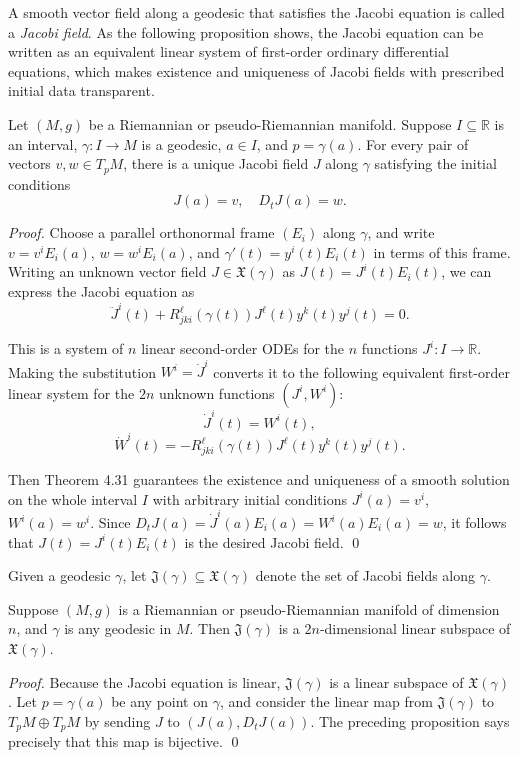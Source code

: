A smooth vector field along a geodesic that satisfies the Jacobi equation is called a \emph{Jacobi field}. As the following proposition shows, the Jacobi equation can be written as an equivalent linear system of first-order ordinary differential equations, which makes existence and uniqueness of Jacobi fields with prescribed initial data transparent.

\begin{proposition}
\label{prop:existence-uniqueness-jacobi-fields}

Let $(M,g)$ be a Riemannian or pseudo-Riemannian manifold. Suppose $I \subseteq \mathbb{R}$ is an interval, $\gamma : I \to M$ is a geodesic, $a \in I$, and $p = \gamma(a)$. For every pair of vectors $v, w \in T_p M$, there is a unique Jacobi field $J$ along $\gamma$ satisfying the initial conditions
\[
J(a) = v, \quad D_t J(a) = w.
\]

\textit{Proof.} Choose a parallel orthonormal frame $(E_i)$ along $\gamma$, and write $v = v^i E_i(a)$, $w = w^i E_i(a)$, and $\gamma'(t) = y^i(t) E_i(t)$ in terms of this frame. Writing an unknown vector field $J \in \mathfrak{X}(\gamma)$ as $J(t) = J^i(t) E_i(t)$, we can express the Jacobi equation as
\[
\ddot{J}^i(t) + R_{jki}^\ell(\gamma(t)) J^\ell(t) y^k(t) y^j(t) = 0.
\]

This is a system of $n$ linear second-order ODEs for the $n$ functions $J^i : I \to \mathbb{R}$. Making the substitution $W^i = \dot{J}^i$ converts it to the following equivalent first-order linear system for the $2n$ unknown functions $(J^i, W^i)$:
\[
\dot{J}^i(t) = W^i(t),
\]
\[
\dot{W}^i(t) = -R_{jki}^\ell(\gamma(t)) J^\ell(t) y^k(t) y^j(t).
\]

Then Theorem 4.31 guarantees the existence and uniqueness of a smooth solution on the whole interval $I$ with arbitrary initial conditions $J^i(a) = v^i$, $W^i(a) = w^i$. Since $D_t J(a) = \dot{J}^i(a) E_i(a) = W^i(a) E_i(a) = w$, it follows that $J(t) = J^i(t) E_i(t)$ is the desired Jacobi field. \qed
\end{proposition}

Given a geodesic $\gamma$, let $\mathfrak{J}(\gamma) \subseteq \mathfrak{X}(\gamma)$ denote the set of Jacobi fields along $\gamma$.

\begin{corollary}
\label{cor:jacobi-space-dimension}

Suppose $(M,g)$ is a Riemannian or pseudo-Riemannian manifold of dimension $n$, and $\gamma$ is any geodesic in $M$. Then $\mathfrak{J}(\gamma)$ is a $2n$-dimensional linear subspace of $\mathfrak{X}(\gamma)$.

\textit{Proof.} Because the Jacobi equation is linear, $\mathfrak{J}(\gamma)$ is a linear subspace of $\mathfrak{X}(\gamma)$. Let $p = \gamma(a)$ be any point on $\gamma$, and consider the linear map from $\mathfrak{J}(\gamma)$ to $T_p M \oplus T_p M$ by sending $J$ to $(J(a), D_t J(a))$. The preceding proposition says precisely that this map is bijective. \qed
\end{corollary}

